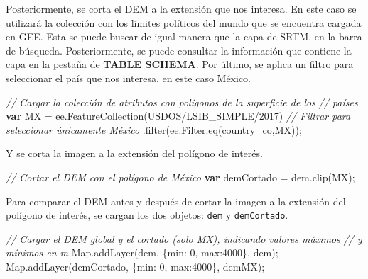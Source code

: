 \documentclass[
  12pt,
  letterpaper,
  twoside]{book}
\newenvironment{Shaded}{\begin{snugshade}}{\end{snugshade}}
\newcommand{\AttributeTok}[1]{\textcolor[rgb]{0.48,0.12,0.64}{#1}}
\newcommand{\CommentTok}[1]{\textcolor[rgb]{0.24,0.58,0.00}{\textit{#1}}}
\newcommand{\ControlFlowTok}[1]{\textcolor[rgb]{0.00,0.00,0.00}{\textbf{#1}}}
\newcommand{\DataTypeTok}[1]{\textcolor[rgb]{0.00,0.00,0.00}{#1}}
\newcommand{\DecValTok}[1]{\textcolor[rgb]{0.28,0.53,0.93}{#1}}
\newcommand{\FunctionTok}[1]{\textcolor[rgb]{0.48,0.12,0.64}{#1}}
\newcommand{\KeywordTok}[1]{\textcolor[rgb]{0.48,0.12,0.64}{#1}}
\newcommand{\NormalTok}[1]{#1}
\newcommand{\OperatorTok}[1]{\textcolor[rgb]{0.00,0.00,0.00}{#1}}
\newcommand{\StringTok}[1]{\textcolor[rgb]{0.87,0.29,0.22}{#1}}
\begin{document}
Posteriormente, se corta el DEM a la extensión que nos interesa. En este caso se utilizará la colección con los límites políticos del mundo que se encuentra cargada en GEE. Esta se puede buscar de igual manera que la capa de SRTM, en la barra de búsqueda. Posteriormente, se puede consultar la información que contiene la capa en la pestaña de \textbf{TABLE SCHEMA}. Por último, se aplica un filtro para seleccionar el país que nos interesa, en este caso México.

\begin{Shaded}
\begin{Highlighting}[]
\CommentTok{// Cargar la colección de atributos con polígonos de la superficie de los }
\CommentTok{// países}
\ControlFlowTok{var}\NormalTok{ MX }\OperatorTok{=} \KeywordTok{ee}\OperatorTok{.}\FunctionTok{FeatureCollection}\NormalTok{(}\StringTok{\textquotesingle{}USDOS/LSIB\_SIMPLE/2017\textquotesingle{}}\NormalTok{)}
   \CommentTok{// Filtrar para seleccionar únicamente México}
  \OperatorTok{.}\FunctionTok{filter}\NormalTok{(}\KeywordTok{ee}\OperatorTok{.}\AttributeTok{Filter}\OperatorTok{.}\FunctionTok{eq}\NormalTok{(}\StringTok{\textquotesingle{}country\_co\textquotesingle{}}\OperatorTok{,}\StringTok{\textquotesingle{}MX\textquotesingle{}}\NormalTok{))}\OperatorTok{;}
\end{Highlighting}
\end{Shaded}

Y se corta la imagen a la extensión del polígono de interés.

\begin{Shaded}
\begin{Highlighting}[]
\CommentTok{// Cortar el DEM con el polígono de México}
\ControlFlowTok{var}\NormalTok{ demCortado }\OperatorTok{=}\NormalTok{ dem}\OperatorTok{.}\FunctionTok{clip}\NormalTok{(MX)}\OperatorTok{;}
\end{Highlighting}
\end{Shaded}

Para comparar el DEM antes y después de cortar la imagen a la extensión del polígono de interés, se cargan los dos objetos: \texttt{dem} y \texttt{demCortado}.

\begin{Shaded}
\begin{Highlighting}[]
\CommentTok{// Cargar el DEM global y el cortado (solo MX), indicando valores máximos }
\CommentTok{// y mínimos en m}
\KeywordTok{Map}\OperatorTok{.}\FunctionTok{addLayer}\NormalTok{(dem}\OperatorTok{,}\NormalTok{ \{}\DataTypeTok{min}\OperatorTok{:} \DecValTok{0}\OperatorTok{,} \DataTypeTok{max}\OperatorTok{:}\DecValTok{4000}\NormalTok{\}}\OperatorTok{,} \StringTok{\textquotesingle{}dem\textquotesingle{}}\NormalTok{)}\OperatorTok{;}
\KeywordTok{Map}\OperatorTok{.}\FunctionTok{addLayer}\NormalTok{(demCortado}\OperatorTok{,}\NormalTok{ \{}\DataTypeTok{min}\OperatorTok{:} \DecValTok{0}\OperatorTok{,} \DataTypeTok{max}\OperatorTok{:}\DecValTok{4000}\NormalTok{\}}\OperatorTok{,} \StringTok{\textquotesingle{}demMX\textquotesingle{}}\NormalTok{)}\OperatorTok{;}
\end{Highlighting}
\end{Shaded}
\end{document}
